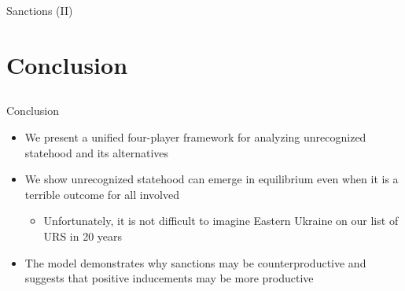 \documentclass[handout]{beamer}
\begin{document}
\begin{frame}{Sanctions (II)}

\end{frame}


\section{Conclusion}
\subsection{}
\begin{frame}{Conclusion}
\begin{itemize}[<+->]
	\item We present a unified four-player framework for analyzing unrecognized statehood and its alternatives
	\item We show unrecognized statehood can emerge in equilibrium even when it is a terrible outcome for all involved
		\begin{itemize}
			\item Unfortunately, it is not difficult to imagine Eastern Ukraine on our list of URS in 20 years
		\end{itemize}
	\item The model demonstrates why sanctions may be counterproductive and suggests that positive inducements may be more productive
\end{itemize}

\end{frame}
\end{document}

